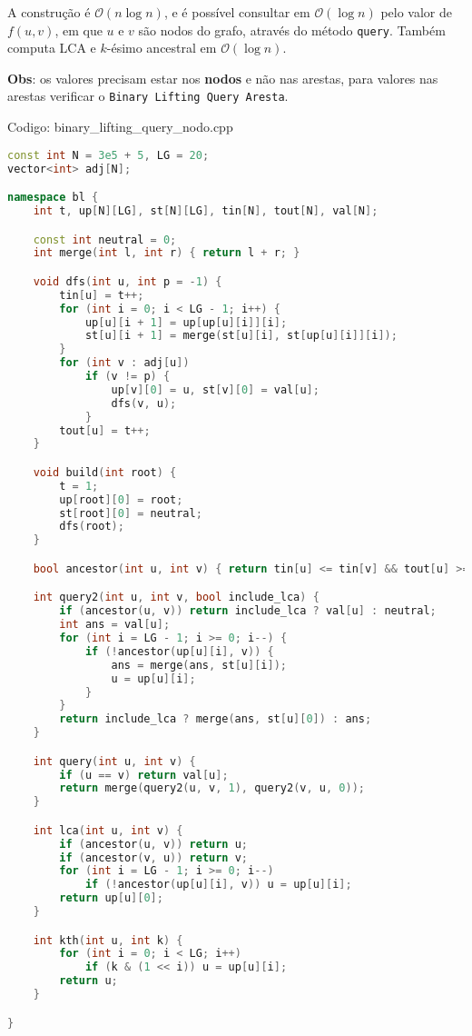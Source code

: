 \documentclass[10pt, a4paper, oneside]{book}
\begin{document}
A construção é $\mathcal{O}(n \log n)$, e é possível consultar em $\mathcal{O}(\log n)$ pelo valor de $f(u, v)$, em que $u$ e $v$ são nodos do grafo, através do método \texttt{query}. Também computa LCA e $k$-ésimo ancestral em $\mathcal{O}(\log n)$.



\textbf{Obs}: os valores precisam estar nos \textbf{nodos} e não nas arestas, para valores nas arestas verificar o \texttt{Binary Lifting Query Aresta}.
\hfill

Codigo: binary\_lifting\_query\_nodo.cpp

\begin{lstlisting}[language=C++]
const int N = 3e5 + 5, LG = 20;
vector<int> adj[N];

namespace bl {
    int t, up[N][LG], st[N][LG], tin[N], tout[N], val[N];

    const int neutral = 0;
    int merge(int l, int r) { return l + r; }

    void dfs(int u, int p = -1) {
        tin[u] = t++;
        for (int i = 0; i < LG - 1; i++) {
            up[u][i + 1] = up[up[u][i]][i];
            st[u][i + 1] = merge(st[u][i], st[up[u][i]][i]);
        }
        for (int v : adj[u])
            if (v != p) {
                up[v][0] = u, st[v][0] = val[u];
                dfs(v, u);
            }
        tout[u] = t++;
    }

    void build(int root) {
        t = 1;
        up[root][0] = root;
        st[root][0] = neutral;
        dfs(root);
    }

    bool ancestor(int u, int v) { return tin[u] <= tin[v] && tout[u] >= tout[v]; }

    int query2(int u, int v, bool include_lca) {
        if (ancestor(u, v)) return include_lca ? val[u] : neutral;
        int ans = val[u];
        for (int i = LG - 1; i >= 0; i--) {
            if (!ancestor(up[u][i], v)) {
                ans = merge(ans, st[u][i]);
                u = up[u][i];
            }
        }
        return include_lca ? merge(ans, st[u][0]) : ans;
    }

    int query(int u, int v) {
        if (u == v) return val[u];
        return merge(query2(u, v, 1), query2(v, u, 0));
    }

    int lca(int u, int v) {
        if (ancestor(u, v)) return u;
        if (ancestor(v, u)) return v;
        for (int i = LG - 1; i >= 0; i--)
            if (!ancestor(up[u][i], v)) u = up[u][i];
        return up[u][0];
    }

    int kth(int u, int k) {
        for (int i = 0; i < LG; i++)
            if (k & (1 << i)) u = up[u][i];
        return u;
    }

}
\end{lstlisting}
\hfill
\end{document}
